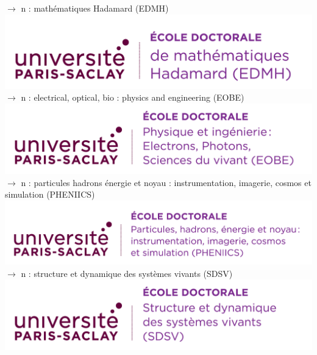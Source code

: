 \documentclass[french,12pt,a4paper]{book}
\begin{document}
\noindent \textbf{\color{Prune}$\rightarrow$} n : mathématiques Hadamard (EDMH)\\
\includegraphics[scale=.7]{logo_usp_EDMH.png}\\

\noindent \textbf{\color{Prune}$\rightarrow$} n : electrical, optical, bio : physics and engineering  (EOBE)\\
\includegraphics[scale=0.15]{EOBE.png}\\

\noindent \textbf{\color{Prune}$\rightarrow$} n : particules hadrons énergie et noyau : instrumentation, imagerie, cosmos et simulation (PHENIICS)\\
\includegraphics[scale=.7]{logo_usp_PHENIICS.png}\\

\noindent \textbf{\color{Prune}$\rightarrow$} n : structure et dynamique des systèmes vivants (SDSV)\\
\includegraphics[scale=.7]{logo_usp_SDSV.png}\\
\end{document}
